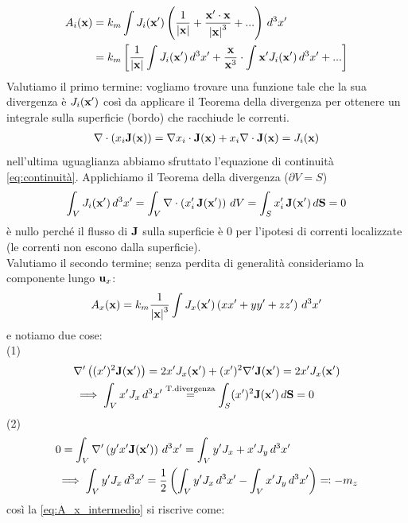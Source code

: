 \begin{align}
  A_i(\mathbf{ x }) &= k_m \int J_i(\mathbf{ x' }) \left( \frac{1}{\mathbf{ |x| }} + \frac{\mathbf{ x' \cdot x }}{\mathbf{ |x| }^3} + ... \right) \,d^3x' \\
  &= k_m \left[ \frac{1}{\mathbf{ |x| }} \int J_i(\mathbf{ x' }) \,d^3x' + \frac{\mathbf{ x }}{\mathbf{ x }^3} \cdot \int \mathbf{ x' } J_i(\mathbf{ x' }) \,d^3x' + ...\right]
\end{align}
Valutiamo il primo termine: vogliamo trovare una funzione tale che la sua divergenza è $ J_i(\mathbf{ x' }) $ così da applicare il Teorema della divergenza
per ottenere un integrale sulla superficie (bordo) che racchiude le correnti. 
\begin{align}
  \nabla \cdot \left( x_i \mathbf{ J(x) } \right) = \nabla x_i \cdot \mathbf{ J(x) } + x_i\nabla \cdot \mathbf{ J(x) } = J_i(\mathbf{ x })
\end{align}
nell'ultima uguaglianza abbiamo sfruttato l'equazione di continuità \eqref{eq:continuità}. Applichiamo il Teorema della divergenza ($ \partial V = S $)
\begin{align}
  \int_V J_i(\mathbf{ x' }) \,d^3x' = \int_V \nabla \cdot \left( x_i ' \, \mathbf{ J(x') } \right)  \,dV = \int_S x_i ' \, \mathbf{ J(x') } \,d\mathbf{ S } = 0
\end{align}
è nullo perché il flusso di $ \mathbf{ J } $ sulla superficie è $ 0 $ per l'ipotesi di correnti localizzate (le correnti non escono dalla superficie).\\
Valutiamo il secondo termine; senza perdita di generalità consideriamo la componente lungo $ \mathbf{ u }_x $:
\begin{align}
  A_x(\mathbf{ x }) = k_m \frac{1}{\mathbf{ |x| }^3} \int J_x(\mathbf{ x' }) \left( xx' + yy' + zz' \right) \,d^3x' \label{eq:A_x_intermedio}
\end{align}
e notiamo due cose:\\
(1)
\begin{align}
  &\nabla ' \left( (x')^2\mathbf{ J(x') } \right) = 2x'J_x(\mathbf{ x' }) + (x')^2 \nabla' \mathbf{ J(x') } = 2x'J_x(\mathbf{ x' })\\
  &\implies \int_V x'J_x \,d^3x' \overset{\text{T.divergenza}}{=} \int_S (x')^2\mathbf{ J(x') } \,d\mathbf{ S } = 0
\end{align}
(2)
\begin{align}
  & 0= \int_V \nabla'\left( y'x'\mathbf{ J(x') } \right) \,d^3x' = \int_V y'J_x + x'J_y  \,d^3x'\\
  &\implies \int_V y'J_x \,d^3x' = \frac{1}{2} \left( \int_V y'J_x \,d^3x'- \int_V x'J_y \,d^3x' \right) \eqcolon -m_z
\end{align}
così la \eqref{eq:A_x_intermedio} si riscrive come:
